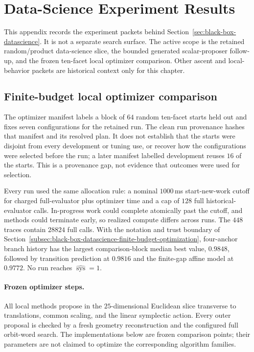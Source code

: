 \section{Data-Science Experiment Results}\label{app:datascience-results}

This appendix records the experiment packets behind
Section~\ref{sec:black-box-datascience}.  It is not a separate search surface.
The active scope is the retained random/product data-science slice, the
bounded generated scalar-proposer follow-up, and the frozen ten-facet local
optimizer comparison.  Other ascent and local-behavior packets are historical
context only for this chapter.

\subsection{Finite-budget local optimizer comparison}

The optimizer manifest labels a block of \(64\) random ten-facet starts held
out and fixes seven configurations for the retained run.  The clean run
provenance hashes that manifest and its resolved plan.  It does not establish
that the starts were disjoint from every development or tuning use, or recover
how the configurations were selected before the run; a later manifest labelled
development reuses \(16\) of the starts.  This is a provenance gap, not evidence
that outcomes were used for selection.

Every run used the same allocation rule: a nominal \(1000\)\,ms
start-new-work cutoff for charged full-evaluator plus optimizer time and a cap
of \(128\) full historical-evaluator calls.  In-progress work could complete
atomically past the cutoff, and methods could terminate early, so realized
compute differs across runs.  The \(448\) traces contain \(28824\) full calls.
With the notation and trust boundary of
Section~\ref{subsec:black-box-datascience-finite-budget-optimization},
four-anchor branch history has the largest comparison-block median best value,
\(0.9848\), followed by transition prediction at \(0.9816\) and the finite-gap
affine model at \(0.9772\).  No run reaches
\(\widehat{\operatorname{sys}}=1\).

\paragraph{Frozen optimizer steps.}
All local methods propose in the \(25\)-dimensional Euclidean slice transverse
to translations, common scaling, and the linear symplectic action.  Every
outer proposal is checked by a fresh geometry reconstruction and the
configured full orbit-word search.  The implementations below are frozen
comparison points; their parameters are not claimed to optimize the
corresponding algorithm families.

